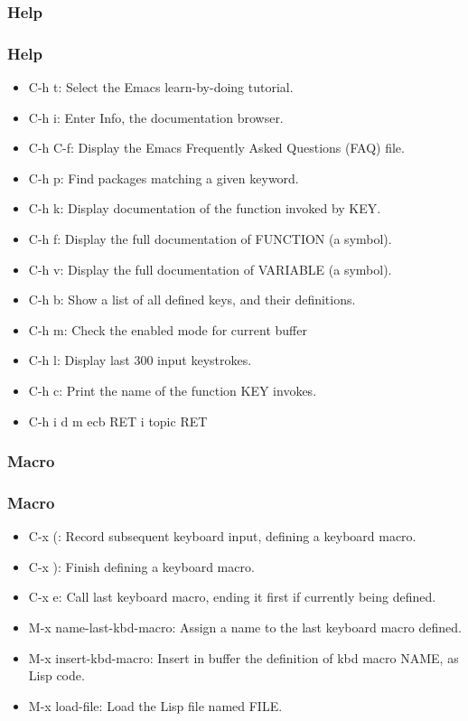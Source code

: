 \subsubsection{Help}
\begin{frame}
\frametitle{Help}
    \begin{itemize}
        \item C-h t: Select the Emacs learn-by-doing tutorial.
        \item C-h i: Enter Info, the documentation browser.
        \item C-h C-f: Display the Emacs Frequently Asked Questions (FAQ) file.
        \item C-h p: Find packages matching a given keyword.
        \item C-h k: Display documentation of the function invoked by KEY.
        \item C-h f: Display the full documentation of FUNCTION (a symbol).
        \item C-h v: Display the full documentation of VARIABLE (a symbol).
        \item C-h b: Show a list of all defined keys, and their definitions.
        \item C-h m: Check the enabled mode for current buffer
        \item C-h l: Display last 300 input keystrokes.
        \item C-h c: Print the name of the function KEY invokes.
        \item C-h i d m ecb RET i topic RET
    \end{itemize}
\end{frame}
\subsubsection{Macro}
\begin{frame}
\frametitle{Macro}
    \begin{itemize}
        \item C-x (: Record subsequent keyboard input, defining a keyboard macro.
        \item C-x ): Finish defining a keyboard macro.
        \item C-x e: Call last keyboard macro, ending it first if currently being defined.
        \item M-x name-last-kbd-macro: Assign a name to the last keyboard macro defined.
        \item M-x insert-kbd-macro: Insert in buffer the definition of kbd macro NAME, as Lisp code.
        \item M-x load-file: Load the Lisp file named FILE.
    \end{itemize}
\end{frame}
